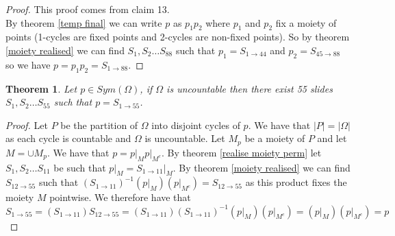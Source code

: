 \documentclass{report}
\newtheorem{theorem}{Theorem}[section]
\begin{document}
\begin{proof}
This proof comes from \cite{shuffle1} claim 13.\\
By theorem \ref{temp final} we can write \(p\) as \(p_1p_2\) where \(p_1\) and \(p_2\) fix a moiety of points (1-cycles are fixed points and 2-cycles are non-fixed points). So by theorem \ref{moiety realised} we can find \(S_1,S_2\ldots S_{88}\) such that \(p_1=S_{1\rightarrow 44}\) and \(p_2=S_{45\rightarrow 88}\) so we have \(p=p_1p_2=S_{1\rightarrow 88}\).
\end{proof}
\begin{theorem}
Let \(p \in Sym(\Omega)\), if \(\Omega\) is uncountable then there exist 55 slides \(S_1,S_2\ldots S_{55}\) such that \(p=S_{1\rightarrow 55}\).
\end{theorem}
\begin{proof}
Let \(P\) be the partition of \(\Omega\) into disjoint cycles of \(p\). We have that \(|P|=|\Omega|\) as each cycle is countable and \(\Omega\) is uncountable. Let \(M_p\) be a moiety of \(P\) and let \(M=\cup M_p\). We have that \(p = p\vert_{M}p\vert_{M^c}\). By theorem \ref{realise moiety perm} let \(S_1,S_2 \ldots S_{11}\) be such that \(p\vert_{M}=S_{1\rightarrow 11}\vert_{M}\). By theorem \ref{moiety realised} we can find \(S_{12\rightarrow 55}\) such that \((S_{1\rightarrow 11})^{-1}(p\vert_{M})(p\vert_{M^c}) =S_{12\rightarrow 55}\) as this product fixes the moiety \(M\) pointwise. We therefore have that 
\[S_{1\rightarrow 55}=(S_{1\rightarrow  11})S_{12\rightarrow 55}=(S_{1\rightarrow 11})(S_{1\rightarrow11})^{-1}(p\vert_{M})(p\vert_{M^c}) =(p\vert_{M})(p\vert_{M^c})=p\]
\end{proof}
\end{document}
